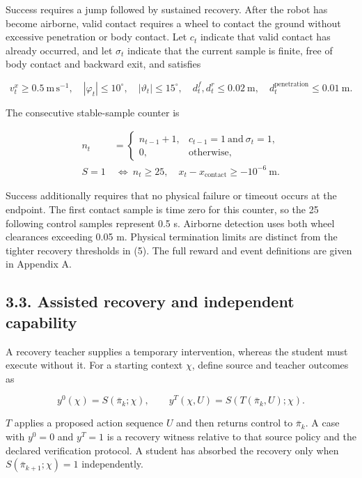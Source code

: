 \documentclass[
  american,
  11pt,
  a4paper,
]{article}
\begin{document}
Success requires a jump followed by sustained recovery. After the robot
has become airborne, valid contact requires a wheel to contact the
ground without excessive penetration or body contact. Let \(c_t\)
indicate that valid contact has already occurred, and let \(\sigma_t\)
indicate that the current sample is finite, free of body contact and
backward exit, and satisfies

\[
v_t^x\ge0.5\ \mathrm{m\,s^{-1}},\quad
|\varphi_t|\le10^\circ,\quad |\vartheta_t|\le15^\circ,\quad
d_t^{f},d_t^{r}\le0.02\ {\mathrm{m}},\quad
d_t^{\mathrm{penetration}}\le0.01\ {\mathrm{m}}.
\tag{5}\label{eq:5}
\]

The consecutive stable-sample counter is

\[
\begin{aligned}
n_t&=
\begin{cases}
n_{t-1}+1,&c_{t-1}=1\ \text{and}\ \sigma_t=1,\\
0,&\text{otherwise},
\end{cases}\\
S=1&\ \Longleftrightarrow\
n_t\ge25,\quad x_t-x_{\mathrm{contact}}\ge-10^{-6}\ \mathrm{m}.
\end{aligned}
\tag{6}\label{eq:6}
\]

Success additionally requires that no physical failure or timeout occurs
at the endpoint. The first contact sample is time zero for this counter,
so the 25 following control samples represent 0.5 s. Airborne detection
uses both wheel clearances exceeding 0.05 m. Physical termination limits
are distinct from the tighter recovery thresholds in (5). The full
reward and event definitions are given in Appendix A.

\subsection{3.3. Assisted recovery and independent
capability}\label{assisted-recovery-and-independent-capability}

A recovery teacher supplies a temporary intervention, whereas the
student must execute without it. For a starting context \(\chi\), define
source and teacher outcomes as

\[
y^0(\chi)=S(\bar\pi_k;\chi),\qquad
y^T(\chi,U)=S(T(\bar\pi_k,U);\chi).
\tag{7}\label{eq:7}
\]

\(T\) applies a proposed action sequence \(U\) and then returns control
to \(\bar\pi_k\). A case with \(y^0=0\) and \(y^T=1\) is a recovery
witness relative to that source policy and the declared verification
protocol. A student has absorbed the recovery only when
\(S(\bar\pi_{k+1};\chi)=1\) independently.
\end{document}
